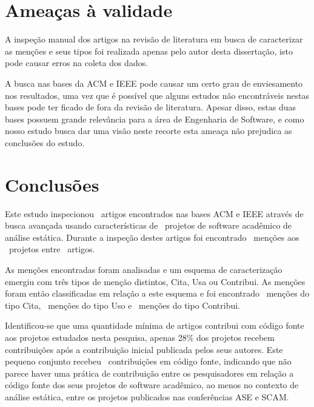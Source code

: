 
\section{Ameaças à validade} %

A inspeção manual dos artigos na revisão de literatura em busca de caracterizar
as menções e seus tipos foi realizada apenas pelo autor desta dissertação, isto
pode causar erros na coleta dos dados.

A busca nas bases da ACM e IEEE pode causar um certo grau de enviesamento
nos resultados, uma vez que é possível que alguns estudos não encontráveis nestas
bases pode ter ficado de fora da revisão de literatura. Apesar disso, estas duas
bases possuem grande relevância para a área de Engenharia de Software, e como
nosso estudo busca dar uma visão neste recorte esta ameaça não prejudica as
conclusões do estudo.


\section{Conclusões} \label{estudo2:conclusoes} %

Este estudo inspecionou \SearchUniqueCount \ artigos encontrados nas bases ACM
e IEEE através de busca avançada usando características de \SoftwareCount \ projetos de software
acadêmico de análise estática. Durante a inspeção destes artigos foi encontrado
\ScreeningCount \ menções aos \SoftwareCount \ projetos entre
\ScreeningUniqueCount \ artigos.

As menções encontradas foram analisadas e um esquema de caracterização emergiu com
três tipos de menção distintos, Cita, Usa ou Contribui. As menções foram então
classificadas em relação a este esquema e foi encontrado
\CiteCount \ menções do tipo Cita,
\UseCount \ menções do tipo Uso e
\ContributeCount \ menções do tipo Contribui.

Identificou-se que uma quantidade mínima de artigos contribui com código fonte aos
projetos estudados nesta pesquisa, apenas 28\% dos projetos recebem contribuições
após a contribuição inicial publicada pelos seus autores. Este pequeno conjunto
recebeu \ContributeStudyDoisCount \ contribuições em código fonte, indicando que
não parece haver uma prática de contribuição entre os pesquisadores em relação
a código fonte dos seus projetos de software acadêmico, ao menos no contexto de análise
estática, entre os projetos publicados nas conferências ASE e SCAM.

